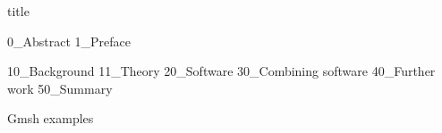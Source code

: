 \documentclass[12pt]{article}
\begin{document}
{title}

\frontmatter \ownfrontmatter

{0_Abstract}
{1_Preface}

\tableofcontents

\clearpage
\listoffigures
{}

\clearpage


\mainmatter \ownmainmatter

{10_Background}
{11_Theory}
{20_Software}
{30_Combining software}
{40_Further work}
{50_Summary}



\clearpage
\printbibliography[heading = bibintoc, title = Bibliography]    %

\addappendix
{Gmsh examples}

\end{document}
